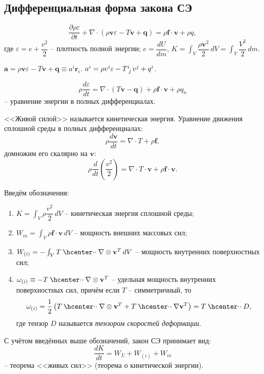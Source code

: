 \subsection{Дифференциальная форма закона СЭ}

\[
  \dfrac{\partial \rho \varepsilon}{\partial t}  + \nabla \cdot \left( \rho \mathbf{v} \varepsilon - T \mathbf{v} + \mathbf{q} \right) = \rho \mathbf{f} \cdot \mathbf{v} + \rho q,
\]
где $\varepsilon = e + \dfrac{v^2}{2}$ -- плотность полной энергии; $e = \dfrac{dU}{dm}$, 
$K = \int_V \dfrac{\rho \mathbf{v}^2}{2} \, dV = \int_V \dfrac{V^2}{2} \, dm$.

$\mathbf{a} = \rho \mathbf{v} \varepsilon - T \mathbf{v} + \mathbf{q} \equiv a^i \mathbf{r}_i$.
$a^i = \rho v^i \varepsilon - \tensor{T}{^i_j} v^j + q^i$.

\[
  \rho \dfrac{d\varepsilon}{dt} = \nabla \cdot (T \mathbf{v} - \mathbf{q}) + \rho \mathbf{f} \cdot \mathbf{v} + \rho q_n
\]
-- уравнение энергии в полных дифференциалах.

\begin{theorem}
  <<Живой силой>> называется кинетическая энергия.
  Уравнение движения сплошной среды в полных дифференциалах:
  \[
    \rho \dfrac{d\mathbf{v}}{dt} = \nabla \cdot T + \rho \mathbf{f},
  \]
  домножим его скалярно на $\mathbf{v}$:
  \[
    \rho \dfrac{d}{dt} \left( \dfrac{v^2}{2} \right) = \nabla \cdot T \cdot \mathbf{v} + \rho \mathbf{f} \cdot \mathbf{v}.
  \]

\end{theorem}

\begin{remark}
  Введём обозначения:
  \begin{enumerate}
    \item $K = \int_V \rho \dfrac{v^2}{2} \, dV$ -- кинетическая энергия сплошной среды;
    \item $W_m = \int_V \rho \mathbf{f} \cdot \mathbf{v} \, dV$ -- мощность внешних массовых сил;
    \item $W_{(i)} = - \int_V T \cddot \nabla \otimes \mathbf{v}^T \, dV$ -- мощность внутренних поверхностных сил;
    \item $\omega_{(i)} \equiv - T \cddot \nabla \otimes \mathbf{v}^T$ -- удельная мощность внутренних поверхностных сил, причём если $T$ -- симметричный, то
      \[
        \omega_{(i)} = \dfrac{1}{2} \left(  T \cddot \nabla \otimes \mathbf{v}^T + T \cddot \nabla \mathbf{v}^T \right) = T \cddot D,
      \]
      где тензор $D$ называется \emph{тензором скоростей деформации}.
  \end{enumerate}
  С учётом введённых выше обозначений, закон СЭ принимает вид:
  \[
    \dfrac{dK}{dt} = W_\Sigma + W_{(i)} + W_m
  \]
  -- теорема <<живых сил>> (теорема о кинетической энергии).
\end{remark}

